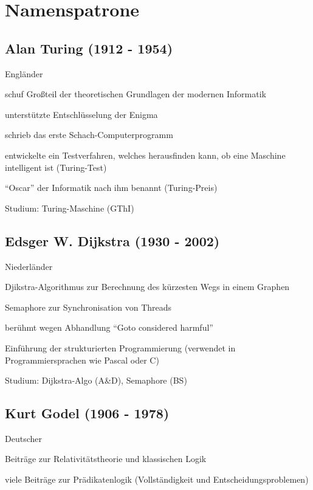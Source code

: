 \documentclass[a4paper,12pt]{report}
\begin{document}
\chapter{Namenspatrone}
\section*{Alan Turing (1912 - 1954)}
\begin{itemize*}
	\item Engländer
	\item schuf Großteil der theoretischen Grundlagen der modernen Informatik
	\item unterstützte Entschlüsselung der Enigma
	\item schrieb das erste Schach-Computerprogramm
	\item entwickelte ein Testverfahren, welches herausfinden kann, ob eine Maschine intelligent ist (Turing-Test)
	\item ``Oscar'' der Informatik nach ihm benannt (Turing-Preis)
	\item Studium: Turing-Maschine (GThI)
\end{itemize*}

\section*{Edsger W. Dijkstra (1930 - 2002)}
\begin{itemize*}
	\item Niederländer
	\item Djikstra-Algorithmus zur Berechnung des kürzesten Wegs in einem Graphen
	\item Semaphore zur Synchronisation von Threads
	\item berühmt wegen Abhandlung ``Goto considered harmful''
	\item Einführung der strukturierten Programmierung (verwendet in Programmiersprachen wie Pascal oder C)
	\item Studium: Dijkstra-Algo (A\&D), Semaphore (BS)
\end{itemize*}

\section*{Kurt Godel (1906 - 1978)}
\begin{itemize*}
	\item Deutscher
	\item Beiträge zur Relativitätstheorie und klassischen Logik
	\item viele Beiträge zur Prädikatenlogik (Vollständigkeit und Entscheidungsproblemen)
\end{itemize*}
\end{document}
